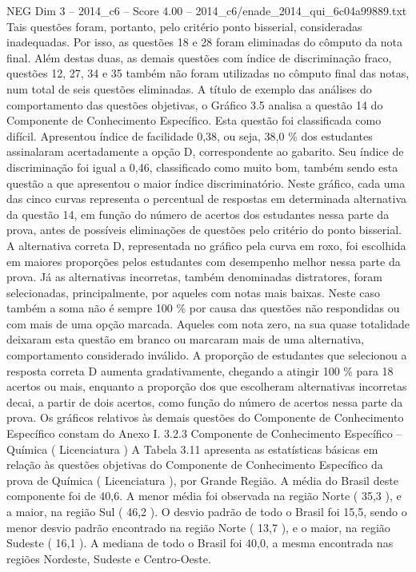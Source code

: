 \begin{textsample}{NEG Dim 3 – 2014\_c6 – Score 4.00 – 2014\_c6/enade\_2014\_qui\_6c04a99889.txt}
Tais questões foram, portanto, pelo critério ponto bisserial, consideradas inadequadas.
Por isso, as questões 18 e 28 foram eliminadas do cômputo da nota final.
Além destas duas, as demais questões com índice de discriminação fraco, questões 12, 27, 34 e 35 também não foram utilizadas no cômputo final das notas, num total de seis questões eliminadas.
A título de exemplo das análises do comportamento das questões objetivas, o Gráfico 3.5 analisa a questão 14 do Componente de Conhecimento Específico.
Esta questão foi classificada como difícil.
Apresentou índice de facilidade 0,38, ou seja, 38,0 \% dos estudantes assinalaram acertadamente a opção D, correspondente ao gabarito.
Seu índice de discriminação foi igual a 0,46, classificado como muito bom, também sendo esta questão a que apresentou o maior índice discriminatório.
Neste gráfico, cada uma das cinco curvas representa o percentual de respostas em determinada alternativa da questão 14, em função do número de acertos dos estudantes nessa parte da prova, antes de possíveis eliminações de questões pelo critério do ponto bisserial.
A alternativa correta D, representada no gráfico pela curva em roxo, foi escolhida em maiores proporções pelos estudantes com desempenho melhor nessa parte da prova.
Já as alternativas incorretas, também denominadas distratores, foram selecionadas, principalmente, por aqueles com notas mais baixas.
Neste caso também a soma não é sempre 100 \% por causa das questões não respondidas ou com mais de uma opção marcada.
Aqueles com nota zero, na sua quase totalidade deixaram esta questão em branco ou marcaram mais de uma alternativa, comportamento considerado inválido.
A proporção de estudantes que selecionou a resposta correta D aumenta gradativamente, chegando a atingir 100 \% para 18 acertos ou mais, enquanto a proporção dos que escolheram alternativas incorretas decai, a partir de dois acertos, como função do número de acertos nessa parte da prova.
Os gráficos relativos às demais questões do Componente de Conhecimento Específico constam do Anexo I. 3.2.3 Componente de Conhecimento Específico – Química ( Licenciatura ) A Tabela 3.11 apresenta as estatísticas básicas em relação às questões objetivas do Componente de Conhecimento Específico da prova de Química ( Licenciatura ), por Grande Região.
A média do Brasil deste componente foi de 40,6.
A menor média foi observada na região Norte ( 35,3 ), e a maior, na região Sul ( 46,2 ).
O desvio padrão de todo o Brasil foi 15,5, sendo o menor desvio padrão encontrado na região Norte ( 13,7 ), e o maior, na região Sudeste ( 16,1 ).
A mediana de todo o Brasil foi 40,0, a mesma encontrada nas regiões Nordeste, Sudeste e Centro-Oeste.

\end{textsample}
